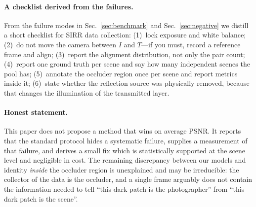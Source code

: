 \paragraph{A checklist derived from the failures.}
From the failure modes in Sec.~\ref{sec:benchmark} and Sec.~\ref{sec:negative} we distill a short
checklist for SIRR data collection: (1)~lock exposure and white balance; (2)~do not move the
camera between $I$ and $T$---if you must, record a reference frame and align; (3)~report the
alignment distribution, not only the pair count; (4)~report one ground truth per scene and say how
many independent scenes the pool has; (5)~annotate the occluder region once per scene and report
metrics inside it; (6)~state whether the reflection source was physically removed, because that
changes the illumination of the transmitted layer.

\paragraph{Honest statement.}
This paper does not propose a method that wins on average PSNR. It reports that the standard
protocol hides a systematic failure, supplies a measurement of that failure, and derives a small
fix which is statistically supported at the scene level and negligible in cost. The remaining
discrepancy between our models and identity \emph{inside} the occluder region is unexplained and
may be irreducible: the collector of the data is the occluder, and a single frame arguably does not
contain the information needed to tell ``this dark patch is the photographer'' from ``this dark
patch is the scene''.
